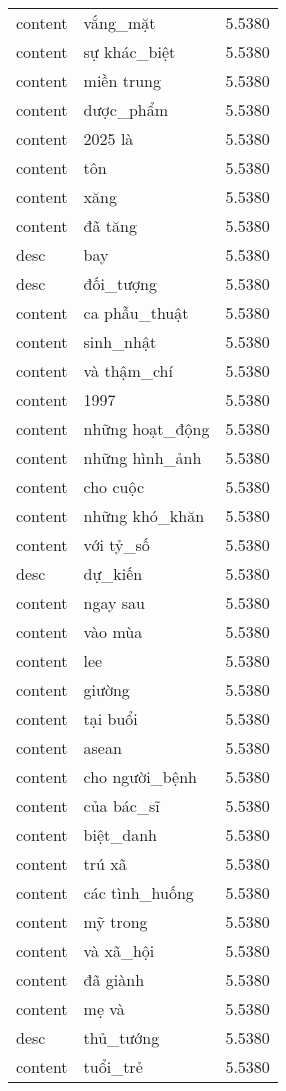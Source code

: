\documentclass{article}
\begin{document}
\begin{tabular}{lll}
content & vắng\_mặt & 5.5380\\
content & sự khác\_biệt & 5.5380\\
content & miền trung & 5.5380\\
content & dược\_phẩm & 5.5380\\
content & 2025 là & 5.5380\\
content & tôn & 5.5380\\
content & xăng & 5.5380\\
content & đã tăng & 5.5380\\
desc & bay & 5.5380\\
desc & đối\_tượng & 5.5380\\
content & ca phẫu\_thuật & 5.5380\\
content & sinh\_nhật & 5.5380\\
content & và thậm\_chí & 5.5380\\
content & 1997 & 5.5380\\
content & những hoạt\_động & 5.5380\\
content & những hình\_ảnh & 5.5380\\
content & cho cuộc & 5.5380\\
content & những khó\_khăn & 5.5380\\
content & với tỷ\_số & 5.5380\\
desc & dự\_kiến & 5.5380\\
content & ngay sau & 5.5380\\
content & vào mùa & 5.5380\\
content & lee & 5.5380\\
content & giường & 5.5380\\
content & tại buổi & 5.5380\\
content & asean & 5.5380\\
content & cho người\_bệnh & 5.5380\\
content & của bác\_sĩ & 5.5380\\
content & biệt\_danh & 5.5380\\
content & trú xã & 5.5380\\
content & các tình\_huống & 5.5380\\
content & mỹ trong & 5.5380\\
content & và xã\_hội & 5.5380\\
content & đã giành & 5.5380\\
content & mẹ và & 5.5380\\
desc & thủ\_tướng & 5.5380\\
content & tuổi\_trẻ & 5.5380\\

\end{tabular}
\end{document}

